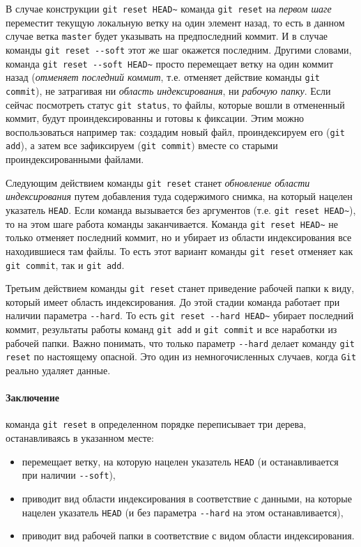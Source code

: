 \documentclass[%
	11pt,
	a4paper,
	utf8,
		]{article}
\begin{document}
В случае конструкции \texttt{git reset HEAD\~} команда \texttt{git reset} на \emph{первом шаге} переместит текущую локальную ветку на один элемент назад, то есть в данном случае ветка \texttt{master} будет указывать на предпоследний коммит. И в случае команды \verb|git reset --soft| этот же шаг окажется последним. Другими словами, команда \verb|git reset --soft HEAD~| просто перемещает ветку на один коммит назад (\emph{отменяет последний коммит}, т.е. отменяет действие команды \texttt{git commit}), не затрагивая ни \emph{область индексирования}, ни \emph{рабочую папку}. Если сейчас посмотреть статус \texttt{git status}, то файлы, которые вошли в отмененный коммит, будут проиндексированны и готовы к фиксации. Этим можно воспользоваться например так: создадим новый файл, проиндексируем его (\texttt{git add}), а затем все зафиксируем (\texttt{git commit}) вместе со старыми проиндексированными файлами.

Следующим действием команды \texttt{git reset} станет \emph{обновление области индексирования} путем добавления туда содержимого снимка, на который нацелен указатель \texttt{HEAD}. Если команда вызывается без аргументов (т.е. \texttt{git reset HEAD\~}), то на этом шаге работа команды заканчивается. Команда \texttt{git reset HEAD\~} не только отменяет последний коммит, но и убирает из области индексирования все находившиеся там файлы. То есть этот вариант команды \texttt{git reset} отменяет как \texttt{git commit}, так и \texttt{git add}.

Третьим действием команды \texttt{git reset} станет приведение рабочей папки к виду, который имеет область индексирования. До этой стадии команда работает при наличии параметра \verb|--hard|. То есть \verb|git reset --hard HEAD~| убирает последний коммит, результаты работы команд \texttt{git add} и \texttt{git commit} и все наработки из рабочей папки. Важно понимать, что только параметр \verb|--hard| делает команду \texttt{git reset} по настоящему опасной. Это один из немногочисленных случаев, когда \texttt{Git} реально удаляет данные. 

\paragraph{Заключение} команда \texttt{git reset} в определенном порядке переписывает три дерева, останавливаясь в указанном месте:
\begin{itemize}
	\item перемещает ветку, на которую нацелен указатель \texttt{HEAD} (и останавливается при наличии \verb|--soft|),
	
	\item приводит вид области индексирования в соответствие с данными, на которые нацелен указатель \texttt{HEAD} (и без параметра \verb|--hard| на этом останавливается),
	
	\item приводит вид рабочей папки в соответствие с видом области индексирования.
\end{itemize}
\end{document}

